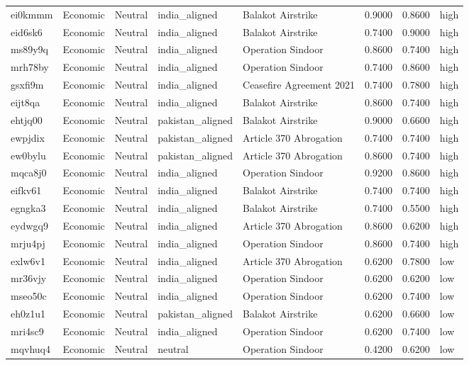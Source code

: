 \begin{longtable}{lllllrrl}
ei0kmmm & Economic & Neutral & india\_aligned & Balakot Airstrike & 0.9000 & 0.8600 & high \\
eid6sk6 & Economic & Neutral & india\_aligned & Balakot Airstrike & 0.7400 & 0.9000 & high \\
ms89y9q & Economic & Neutral & india\_aligned & Operation Sindoor & 0.8600 & 0.7400 & high \\
mrh78by & Economic & Neutral & india\_aligned & Operation Sindoor & 0.7400 & 0.8600 & high \\
gsxfi9m & Economic & Neutral & india\_aligned & Ceasefire Agreement 2021 & 0.7400 & 0.7800 & high \\
eijt8qa & Economic & Neutral & india\_aligned & Balakot Airstrike & 0.8600 & 0.7400 & high \\
ehtjq00 & Economic & Neutral & pakistan\_aligned & Balakot Airstrike & 0.9000 & 0.6600 & high \\
ewpjdix & Economic & Neutral & pakistan\_aligned & Article 370 Abrogation & 0.7400 & 0.7400 & high \\
ew0bylu & Economic & Neutral & pakistan\_aligned & Article 370 Abrogation & 0.8600 & 0.7400 & high \\
mqca8j0 & Economic & Neutral & india\_aligned & Operation Sindoor & 0.9200 & 0.8600 & high \\
eifkv61 & Economic & Neutral & india\_aligned & Balakot Airstrike & 0.7400 & 0.7400 & high \\
egngka3 & Economic & Neutral & india\_aligned & Balakot Airstrike & 0.7400 & 0.5500 & high \\
eydwgq9 & Economic & Neutral & india\_aligned & Article 370 Abrogation & 0.8600 & 0.6200 & high \\
mrju4pj & Economic & Neutral & india\_aligned & Operation Sindoor & 0.8600 & 0.7400 & high \\
exlw6v1 & Economic & Neutral & india\_aligned & Article 370 Abrogation & 0.6200 & 0.7800 & low \\
mr36vjy & Economic & Neutral & india\_aligned & Operation Sindoor & 0.6200 & 0.6200 & low \\
mseo50c & Economic & Neutral & india\_aligned & Operation Sindoor & 0.6200 & 0.7400 & low \\
eh0z1u1 & Economic & Neutral & pakistan\_aligned & Balakot Airstrike & 0.6200 & 0.6600 & low \\
mri4sc9 & Economic & Neutral & india\_aligned & Operation Sindoor & 0.6200 & 0.7400 & low \\
mqvhuq4 & Economic & Neutral & neutral & Operation Sindoor & 0.4200 & 0.6200 & low \\

\end{longtable}
